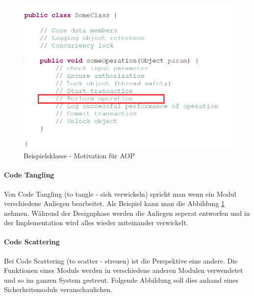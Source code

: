 \begin{figure}[H]
	\centering
		\includegraphics[scale=1.0]{bilder/motivationprogram.png}
	\caption{Beispielsklasse - Motivation für AOP}
	\label{fig:classmotivationaop}
\end{figure}



\paragraph{Code Tangling}

Von Code Tangling (to tangle - sich verwickeln) spricht man wenn ein Modul verschiedene Anliegen bearbeitet. Als Beispiel kann man die Abbildung \ref{fig:classmotivationaop} nehmen. Während der Designphase werden die Anliegen seperat entworfen und in der Implementation wird alles wieder miteinander verwickelt.

\paragraph{Code Scattering}

Bei Code Scattering (to scatter - streuen) ist die Perspektive eine andere. Die Funktionen eines Moduls werden in verschiedene anderen Modulen verwendetet und so im ganzen System gestreut. Folgende Abbildung soll dies anhand eines Sicherheitsmoduls veranschaulichen.

